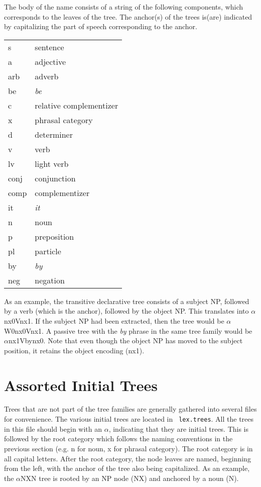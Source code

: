 \noindent The body of the name consists of a string of the following 
components, which corresponds to the leaves of the tree.  The anchor(s) of the
trees is(are) indicated by capitalizing the part of speech corresponding to the
anchor.

\begin{description}
\item\begin{tabular}{ll}
s&sentence\\
a&adjective\\
arb&adverb\\
be&{\it be}\\
c&relative complementizer\\
x&phrasal category\\
d&determiner\\
v&verb\\
lv&light verb\\
conj&conjunction\\
comp&complementizer\\
it&{\it it}\\
n&noun\\
p&preposition\\
pl&particle\\
by&{\it by}\\
neg&negation\\
\end{tabular}
\end{description}

\noindent As an example, the transitive declarative tree consists of a subject
NP, followed by a verb (which is the anchor), followed by the object NP.  This
translates into $\alpha$nx0Vnx1.  If the subject NP had been extracted, then
the tree would be $\alpha$W0nx0Vnx1.  A passive tree with the {\it by} phrase
in the same tree family would be $\alpha$nx1Vbynx0.  Note that even though the
object NP has moved to the subject position, it retains the object encoding
(nx1). 

\section{Assorted Initial Trees}

Trees that are not part of the tree families are generally gathered into
several files for convenience.  The various initial trees are located in {\tt
lex.trees}.  All the trees in this file should begin with an $\alpha$,
indicating that they are initial trees.  This is followed by the root category
which follows the naming conventions in the previous section (e.g. n for noun,
x for phrasal category).  The root category is in all capital letters.  After
the root category, the node leaves are named, beginning from the left, with the
anchor of the tree also being capitalized.  As an example, the $\alpha$NXN
tree is rooted by an NP node (NX) and anchored by a noun (N).

